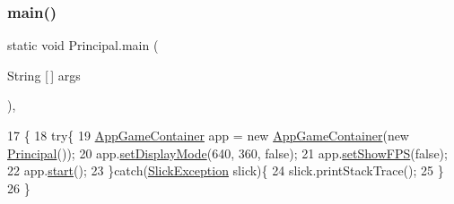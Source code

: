 \subsubsection{\texorpdfstring{main()}{main()}}
{\footnotesize\ttfamily static void Principal.\+main (\begin{DoxyParamCaption}\item[{String \mbox{[}$\,$\mbox{]}}]{args }\end{DoxyParamCaption})\hspace{0.3cm}{\ttfamily [inline]}, {\ttfamily [static]}}


\begin{DoxyCode}
17                                           \{
18     \textcolor{keywordflow}{try}\{    
19         \mbox{\hyperlink{classorg_1_1newdawn_1_1slick_1_1_app_game_container}{AppGameContainer}} app = \textcolor{keyword}{new} \mbox{\hyperlink{classorg_1_1newdawn_1_1slick_1_1_app_game_container}{AppGameContainer}}(\textcolor{keyword}{new} 
      \mbox{\hyperlink{class_principal_a57fba8fa2eedee48e3467024e1a980da}{Principal}}());
20         app.\mbox{\hyperlink{classorg_1_1newdawn_1_1slick_1_1_app_game_container_aa2de68db61ddd3917a8edc0177ebdfe3}{setDisplayMode}}(640, 360, \textcolor{keyword}{false});
21         app.\mbox{\hyperlink{classorg_1_1newdawn_1_1slick_1_1_game_container_aebc1dd5b9cf552bd5c4ff52849920360}{setShowFPS}}(\textcolor{keyword}{false});
22         app.\mbox{\hyperlink{classorg_1_1newdawn_1_1slick_1_1_app_game_container_adcadc0e560e64d03be24c817931fdd54}{start}}();
23     \}\textcolor{keywordflow}{catch}(\mbox{\hyperlink{classorg_1_1newdawn_1_1slick_1_1_slick_exception}{SlickException}} slick)\{
24         slick.printStackTrace();
25     \}
26     \}
\end{DoxyCode}
